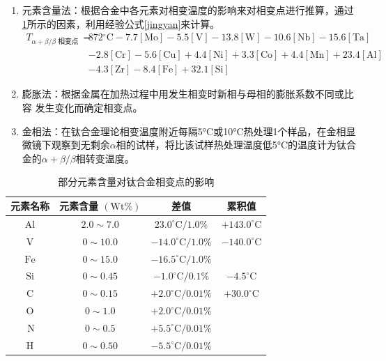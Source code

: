 \documentclass[
class = book,
zihao = -4,
font = noto,
paper = a4paper,
openany
]{easybook}
\begin{document}
\begin{enumerate}
	\item 元素含量法：根据合金中各元素对相变温度的影响来对相变点进行推算，通过\ref{sec:chem4ti}所示\cite{ananyaLocationBasedIntelligent2011}的因素，利用经验公式\ref{jingyan}来计算。
	\begin{equation}
		\begin{aligned}
			T_{\alpha+\beta / \beta \text { 相变点 }}=&872{ }^{\circ} \mathrm{C}-7.7[\mathrm{Mo}]-5.5[\mathrm{V}]-13.8[\mathrm{W}]- 10.6[\mathrm{Nb}]-15.6[\mathrm{Ta}]\\
			&-2.8[\mathrm{Cr}]-5.6[\mathrm{Cu}] +4.4[\mathrm{Ni}]+3.3[\mathrm{Co}]+4.4[\mathrm{Mn}]+23.4[\mathrm{Al}] \\
			& -4.3[\mathrm{Zr}]-8.4[\mathrm{Fe}]+32.1[\mathrm{Si}]
		\end{aligned}
		\label{jingyan}
	\end{equation}
	\item 膨胀法：根据金属在加热过程中用发生相变时新相与母相的膨胀系数不同或比容 发生变化而确定相变点。
	\item 金相法：在钛合金理论相变温度附近每隔5°C或10°C热处理1个样品，在金相显微镜下观察到无剩余$\alpha$相的试样，将比该试样热处理温度低5°C的温度计为钛合金的$\alpha+\beta/\beta$相转变温度。
\end{enumerate}
\begin{table}[htbp]
	\centering
	\caption{部分元素含量对钛合金相变点的影响}
	\label{sec:chem4ti}
\begin{tabular}{cccc}
	\hline 元素名称 & 元素含量 $(\mathrm{Wt} \%)$ & 差值&累积值 \\
	\hline $\mathrm{Al}$ & $2.0 \sim 7.0$ & $23.0^{\circ} \mathrm{C} / 1.0 \%$ & $+143.0^{\circ} \mathrm{C}$ \\
	$\mathrm{V}$ & $0 \sim 10.0$ & $-14.0^{\circ} \mathrm{C} / 1.0 \%$ & $-140.0^{\circ} \mathrm{C}$ \\
	$\mathrm{Fe}$ & $0 \sim 15.0$ & $-16.5^{\circ} \mathrm{C} / 1.0 \%$ & \\
	$\mathrm{Si}$ & $0 \sim 0.45$ & $-1.0^{\circ} \mathrm{C} / 0.1 \%$ & $ -4.5^{\circ} \mathrm{C} $\\
	$\mathrm{C}$ & $0 \sim 0.15$ & $+2.0^{\circ} \mathrm{C} / 0.01 \%$ &$ +30.0^{\circ} \mathrm{C} $\\
	$\mathrm{O}$ & $0 \sim 1.0$ & $+2.0^{\circ} \mathrm{C} / 0.01 \%$& \\
	$\mathrm{~N}$ & $0 \sim 0.5$ & $+5.5^{\circ} \mathrm{C} / 0.01 \%$& \\
	$\mathrm{H}$ & $0 \sim 0.50$ & $-5.5^{\circ} \mathrm{C} / 0.01 \%$ &\\
	\hline
\end{tabular}
\end{table}
\end{document}
